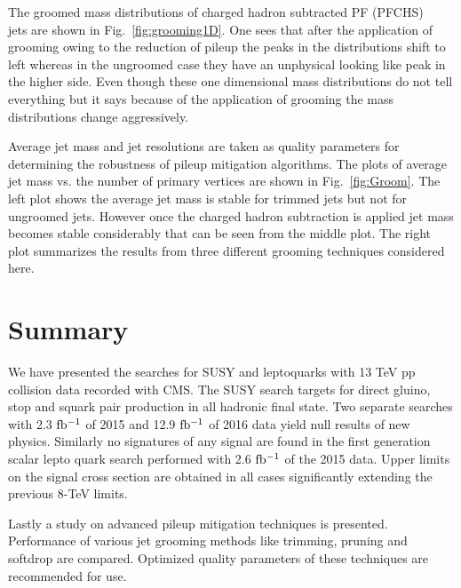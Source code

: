 The groomed mass distributions of charged hadron subtracted PF (PFCHS) ~\cite{Beaudette:2014cea, JMEPAS} jets are shown in Fig.~\ref{fig:grooming1D}. One sees that after the application of grooming owing to the reduction of pileup the peaks in the distributions shift to left whereas in the ungroomed case they have an unphysical looking like peak in the higher side. Even though these one dimensional mass distributions do not tell everything but it says because of the application of grooming the mass distributions change aggressively.  

Average jet mass and jet resolutions are taken as quality parameters for determining the robustness of pileup mitigation algorithms. The plots of average jet mass vs. the number of primary vertices are shown in Fig.~\ref{fig:Groom}. The left plot shows the average jet mass is stable for trimmed jets but not for ungroomed jets. However once the charged hadron subtraction is applied jet mass becomes stable considerably that can be seen from the middle plot. The right plot summarizes the results from three different grooming techniques considered here.


\section{Summary}

We have presented the searches for SUSY and leptoquarks with 13 TeV pp collision data recorded with CMS. The SUSY search targets for direct gluino, stop and squark pair production in all hadronic final state. Two separate searches with 2.3 $\rm fb^{-1}$ of 2015 and 12.9 $\rm fb^{-1}$ of 2016 data yield null results of new physics. Similarly no signatures of any signal are found in the first generation scalar lepto quark search performed with 2.6 $\rm fb^{-1}$ of the 2015 data. Upper limits on the signal cross section  are obtained in all cases significantly extending the previous 8-TeV limits.   

Lastly a study on advanced pileup mitigation techniques is presented. Performance of various jet grooming methods like trimming, pruning and softdrop are compared. Optimized quality parameters of these techniques are recommended for use.   



\newpage












